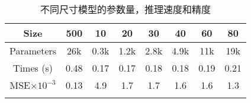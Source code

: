 
\begin{center}
\begin{table}
	\caption{不同尺寸模型的参数量，推理速度和精度}
	\begin{tabular}{cccccccc}
		\toprule
		 Size			&				500		&	10		&	20		&	30		&	40		&	60		&	80		\\	\midrule
		 Parameters		&				26k		&	0.3k	&	1.2k	&	2.8k	&	4.9k	&	11k		&	19k	 	\\	
		 Times (s)		&				0.48	&	0.17	&	0.17	&	0.18	&	0.18	&	0.19	&	0.21	\\	
		 MSE\(\times 10^{-3}\)&		0.13	&	4.9		&	1.7		&	1.7		&	1.6		&	1.6		&	1.3		\\
	\bottomrule
	\label{tab:accuracy}
	\end{tabular}
\end{table}
\end{center}
